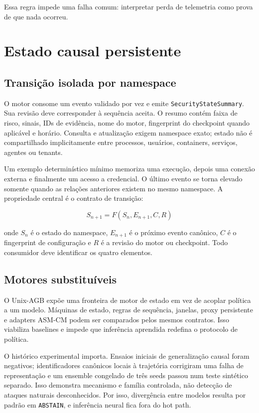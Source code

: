 \documentclass[11pt,a4paper]{article}
\begin{document}
Essa regra impede uma falha comum: interpretar perda de telemetria como prova de
que nada ocorreu.

\section{Estado causal persistente}

\subsection{Transição isolada por namespace}

O motor consome um evento validado por vez e emite
\texttt{SecurityStateSummary}. Sua revisão deve corresponder à sequência aceita.
O resumo contém faixa de risco, sinais, IDs de evidência, nome do motor,
fingerprint do checkpoint quando aplicável e horário. Consulta e atualização
exigem namespace exato; estado não é compartilhado implicitamente entre
processos, usuários, containers, serviços, agentes ou tenants.

Um exemplo determinístico mínimo memoriza uma execução, depois uma conexão
externa e finalmente um acesso a credencial. O último evento se torna elevado
somente quando as relações anteriores existem no mesmo namespace. A propriedade
central é o contrato de transição:

\[
S_{n+1} = F(S_n, E_{n+1}, C, R)
\]

onde $S_n$ é o estado do namespace, $E_{n+1}$ é o próximo evento canônico, $C$
é o fingerprint de configuração e $R$ é a revisão do motor ou checkpoint. Todo
consumidor deve identificar os quatro elementos.

\subsection{Motores substituíveis}

O Unix-AGB expõe uma fronteira de motor de estado em vez de acoplar política a
um modelo. Máquinas de estado, regras de sequência, janelas, proxy persistente e
adapters ASM-CM podem ser comparados pelos mesmos contratos. Isso viabiliza
baselines e impede que inferência aprendida redefina o protocolo de política.

O histórico experimental importa. Ensaios iniciais de generalização causal
foram negativos; identificadores canônicos locais à trajetória corrigiram uma
falha de representação e um ensemble congelado de três seeds passou num teste
sintético separado. Isso demonstra mecanismo e família controlada, não detecção
de ataques naturais desconhecidos. Por isso, divergência entre modelos resulta
por padrão em \texttt{ABSTAIN}, e inferência neural fica fora do hot path.
\end{document}
